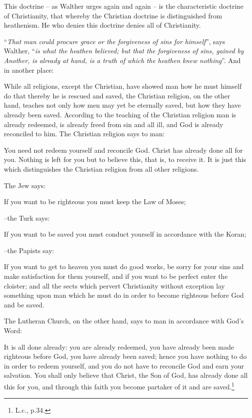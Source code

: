                 This doctrine – as Walther urges again and again – is the characteristic doctrine of Christianity, that whereby the Christian doctrine is distinguished from heathenism.  He who denies this doctrine denies all of Christianity. \par “\textit{That man could procure grace or the forgiveness of sins for himself}”, says Walther, “\textit{is what the heathen believed; but that the forgiveness of sins, gained by Another, is already at hand, is a truth of which the heathen knew nothing}”.  And in another place: \begin{fancyquotes}While all religions, except the Christian, have showed man how he must himself do that thereby he is rescued and saved, the Christian religion, on the other hand, teaches not only how men may yet be eternally saved, but how they have already been saved.  According to the teaching of the Christian religion man is already redeemed, is already freed from sin and all ill, and God is already reconciled to him.  The Christian religion says to man: \begin{displayquote}{\footnotesize You need not redeem yourself and reconcile God.  Christ has already done all for you.  Nothing is left for you but to believe this, that is, to receive it.  It is just this which distinguishes the Christian religion from all other religions.}\end{displayquote}  The Jew says: \begin{displayquote}{\footnotesize If you want to be righteous you must keep the Law of Moses;}\end{displayquote} --the Turk says:\begin{displayquote}{\footnotesize If you want to be saved you must conduct yourself in accordance with the Koran;}\end{displayquote} --the Papists say: \begin{displayquote}{\footnotesize  If you want to get to heaven you must do good works, be sorry for your sins and make satisfaction for them yourself, and if you want to be perfect enter the cloister; and all the sects which pervert Christianity without exception lay something upon man which he must do in order to become righteous before God and be saved.}\end{displayquote}  The Lutheran Church, on the other hand, says to man in accordance with God’s Word: \begin{displayquote}{\footnotesize It is all done already: you are already redeemed, you have already been made righteous before God, you have already been saved; hence you have nothing to do in order to redeem yourself, and you do not have to reconcile God and earn your salvation.  You shall only believe that Christ, the Son of God, has already done all this for you, and through this faith you become partaker of it and are saved.}\footnote{L.c., p.34.}\end{displayquote}\end{fancyquotes}

